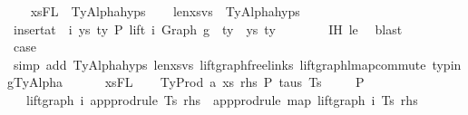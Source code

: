 \begin{isabellebody}
\ \ \isamarkupfalse%
\ xs{\isacharunderscore}{\kern0pt}FL\ {\isacharequal}{\kern0pt}\ TyAlpha{\isachardot}{\kern0pt}hyps{\isacharparenleft}{\kern0pt}{}{\isacharparenright}{\kern0pt}\isanewline
\ \ \isamarkupfalse%
\ len{\isacharunderscore}{\kern0pt}xs{\isacharunderscore}{\kern0pt}vs\ {\isacharequal}{\kern0pt}\ TyAlpha{\isachardot}{\kern0pt}hyps{\isacharparenleft}{\kern0pt}{}{\isacharparenright}{\kern0pt}\isanewline
\isanewline
\ \ \isamarkupfalse%
\ {\isachardoublequoteopen}insert{\isacharunderscore}{\kern0pt}at\ {\isasymGamma}{}\ i\ {\isacharparenleft}{\kern0pt}ys{\isacharcomma}{\kern0pt}\ ty{}{\isacharprime}{\kern0pt}{\isacharparenright}{\kern0pt}\ {\isasymturnstile}{\isacharbraceleft}{\kern0pt}P{\isacharbraceright}{\kern0pt}\ lift\ i\ {\isacharparenleft}{\kern0pt}Graph\ g{\isacharparenright}{\kern0pt}\ {\isacharcolon}{\kern0pt}\ ty{\isachardoublequoteclose}\ \ ys\ ty{}{\isacharprime}{\kern0pt}\isanewline
\ \ \ \ \ \ \isamarkupfalse%
\ IH\ le\ \isamarkupfalse%
\ blast\isanewline
\isanewline
\ \ \isanewline
\isanewline
\ \ \isamarkupfalse%
\ \isamarkupfalse%
\ {\isacharquery}{\kern0pt}case\isanewline
\ \ \ \ \isamarkupfalse%
\ {\isacharparenleft}{\kern0pt}simp\ add{\isacharcolon}{\kern0pt}\ TyAlpha{\isachardot}{\kern0pt}hyps{\isacharparenleft}{\kern0pt}{}{\isacharcomma}{\kern0pt}{}{\isacharparenright}{\kern0pt}\ len{\isacharunderscore}{\kern0pt}xs{\isacharunderscore}{\kern0pt}vs\ lift{\isacharunderscore}{\kern0pt}graph{\isacharunderscore}{\kern0pt}freelinks\ lift{\isacharunderscore}{\kern0pt}graph{\isacharunderscore}{\kern0pt}lmap{\isacharunderscore}{\kern0pt}commute\ typing{\isachardot}{\kern0pt}TyAlpha\isanewline
\ \ \ \ \ \ xs{\isacharunderscore}{\kern0pt}FL{\isacharparenright}{\kern0pt}\isanewline
{}\isamarkupfalse%
\isanewline
\ \ \isamarkupfalse%
\ {\isacharparenleft}{\kern0pt}TyProd\ a\ xs\ rhs\ P\ taus\ Ts\ {\isasymGamma}{\isacharparenright}{\kern0pt}\isanewline
\isanewline
\ \ \isamarkupfalse%
\ P{}{\isacharcolon}{\kern0pt}\isanewline
\ \ \ {\isachardoublequoteopen}lift{\isacharunderscore}{\kern0pt}graph\ i\ {\isacharparenleft}{\kern0pt}app{\isacharunderscore}{\kern0pt}prodrule\ Ts\ rhs{\isacharparenright}{\kern0pt}\ {\isacharequal}{\kern0pt}\ app{\isacharunderscore}{\kern0pt}prodrule\ {\isacharparenleft}{\kern0pt}map\ {\isacharparenleft}{\kern0pt}lift{\isacharunderscore}{\kern0pt}graph\ i{\isacharparenright}{\kern0pt}\ Ts{\isacharparenright}{\kern0pt}\ rhs{\isachardoublequoteclose}\isanewline

\end{isabellebody}
